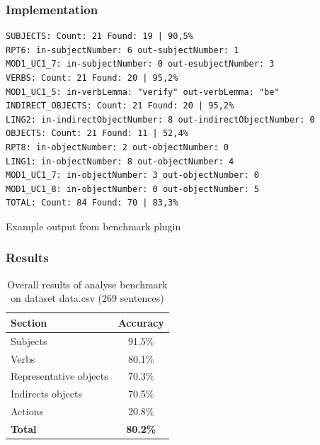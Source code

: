 \subsubsection{Implementation}

\begin{table}[ht]   %
\begin{center}
    \begin{verbatim}
SUBJECTS: Count: 21 Found: 19 | 90,5%
RPT6: in-subjectNumber: 6 out-subjectNumber: 1
MOD1_UC1_7: in-subjectNumber: 0 out-esubjectNumber: 3
VERBS: Count: 21 Found: 20 | 95,2%
MOD1_UC1_5: in-verbLemma: "verify" out-verbLemma: "be"
INDIRECT_OBJECTS: Count: 21 Found: 20 | 95,2%
LING2: in-indirectObjectNumber: 8 out-indirectObjectNumber: 0
OBJECTS: Count: 21 Found: 11 | 52,4%
RPT8: in-objectNumber: 2 out-objectNumber: 0
LING1: in-objectNumber: 8 out-objectNumber: 4
MOD1_UC1_7: in-objectNumber: 3 out-objectNumber: 0
MOD1_UC1_8: in-objectNumber: 0 out-objectNumber: 5
TOTAL: Count: 84 Found: 70 | 83,3%
    \end{verbatim}
  \caption{Example output from benchmark plugin}
  \label{tab.benchmarkexample}
\end{center}
\end{table}   
      
\subsubsection{Results}
                        
\begin{table}[ht]   %
\begin{center}
    \begin{tabular}{|l|c|}
      \hline
      {\bf Section} & {\bf Accuracy} \\
      \hline
      Subjects               & 91.5\% \\
      Verbs                  & 80.1\% \\
      Representative objects & 70.3\% \\
      Indirects objects      & 70.5\% \\
      Actions                & 20.8\% \\
      \hline
      {\bf Total} & {\bf 80.2\%} \\
      \hline
    \end{tabular}
 \caption{Overall results of analyse benchmark on dataset data.csv (269 sentences)}
 \label{tab.benchmark}
\end{center}
\end{table}

